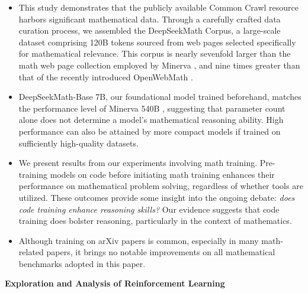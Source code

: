 \begin{itemize}[topsep=0pt]
    \item This study demonstrates that the publicly available Common Crawl resource harbors significant mathematical data. Through a carefully crafted data curation process, we assembled the DeepSeekMath Corpus, a large-scale dataset comprising 120B tokens sourced from web pages selected specifically for mathematical relevance. This corpus is nearly sevenfold larger than the math web page collection employed by Minerva \citep{minerva}, and nine times greater than that of the recently introduced OpenWebMath \citep{openwebmath}.

\item DeepSeekMath-Base 7B, our foundational model trained beforehand, matches the performance level of Minerva 540B \citep{minerva}, suggesting that parameter count alone does not determine a model’s mathematical reasoning ability. High performance can also be attained by more compact models if trained on sufficiently high-quality datasets.

\item We present results from our experiments involving math training. Pre-training models on code before initiating math training enhances their performance on mathematical problem solving, regardless of whether tools are utilized. These outcomes provide some insight into the ongoing debate: \textit{does code training enhance reasoning skills?} Our evidence suggests that code training does bolster reasoning, particularly in the context of mathematics.

    \item Although training on arXiv papers is common, especially in many math-related papers, it brings no notable improvements on all mathematical benchmarks adopted in this paper.
\end{itemize}

\textbf{Exploration and Analysis of Reinforcement Learning}


